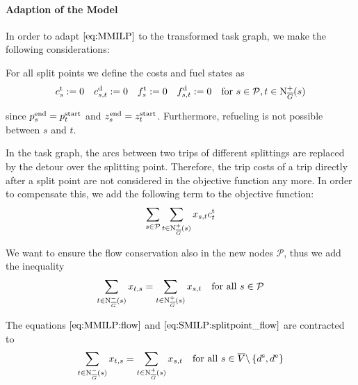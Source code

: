\paragraph{Adaption of the Model} \parfill

In order to adapt $\eqref{eq:MMILP}$ to the transformed task graph, we make the following considerations:

For all split points we define the costs and fuel states as
\begin{align*}
	c^{\operatorname{t}}_s := 0 && c^{\operatorname{d}}_{s,t} := 0 && f^{\operatorname{t}}_s := 0 && f^{\operatorname{d}}_{s,t} := 0 && \text{for } s\in \mathcal{P},t\in\operatorname{N}_{\overline{G}}^+(s)
\end{align*}

since $p^{\operatorname{end}}_s = p^{\operatorname{start}}_t$ and $z^{\operatorname{end}}_s = z^{\operatorname{start}}_t$. Furthermore, refueling is not possible between $s$ and $t$.

In the task graph, the arcs between two trips of different splittings are replaced by the detour over the splitting point. Therefore, the trip costs of a trip directly after a split point are not considered in the objective function any more. In order to compensate this, we add the following term to the objective function:
\begin{align*}
	\sum_{s\in \mathcal{P}}\sum_{t\in\operatorname{N}_{\overline{G}}^+(s)}x_{s,t}c^{\operatorname{t}}_t
\end{align*}

We want to ensure the flow conservation also in the new nodes $\mathcal{P}$, thus we add the inequality
\begin{align}
	\sum_{t\in\operatorname{N}_{\overline{G}}^-(s)} x_{t,s} = \sum_{t\in\operatorname{N}_{\overline{G}}^+(s)} x_{s,t} & & \text{for all } s\in\mathcal{P} \label{eq:SMILP:splitpoint_flow}
\end{align}

The equations $\eqref{eq:MMILP:flow}$ and $\eqref{eq:SMILP:splitpoint_flow}$ are contracted to
\begin{align}
	\sum_{t\in\operatorname{N}_{\overline{G}}^-(s)} x_{t,s} = \sum_{t\in\operatorname{N}_{\overline{G}}^+(s)} x_{s,t} & & \text{for all } s\in \overline{V}\backslash\left\{d^{\operatorname{s}},d^{\operatorname{e}}\right\} \label{eq:SMILP:flow}
\end{align}

\newpage

